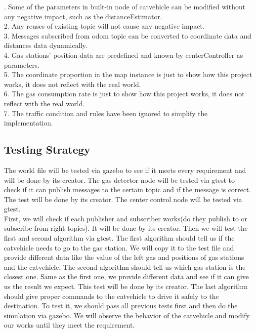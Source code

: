 \documentclass[12pt,onecolumn,titlepage]{article}
\begin{document}
. Some of the parameters in built-in node of catvehicle can be modified without any negative impact, such as the distanceEstimator.\\
2. Any reuses of existing topic will not cause any negative impact. \\
3. Messages subscribed from odom topic can be converted to coordinate data and distances data dynamically. \\
4. Gas stations' position data are predefined and known by centerController as parameters. \\
5. The coordinate proportion in the map instance is just to show how this project works, it does not reflect with the real world.\\
6. The gas consumption rate is just to show how this project works, it does not reflect with the real world.\\
7. The traffic condition and rules have been ignored to simplify the implementation.\\

\subsection{Testing Strategy}

\noindent The world file will be tested via gazebo to see if it meets every requirement and will be done by its creator. The gas detector node will be tested via gtest to check if it can publish messages to the certain topic and if the message is correct. The test will be done by its creator. The center control node will be tested via gtest.\\
 
\noindent First, we will check if each publisher and subscriber works(do they publish to or subscribe from right topics). It will be done by its creator. Then we will test the first and second algorithm via gtest. The first algorithm should tell us if the catvehicle needs to go to the gas station. We will copy it to the test file and provide different data like the value of the left gas and positions of gas stations and the catvehicle. The second algorithm should tell us which gas station is the closest one. Same as the first one, we provide different data and see if it can give us the result we expect. This test will be done by its creator.
The last algorithm should give proper commands to the catvehicle to drive it safely to the destination. To test it, we should pass all previous tests first and then do the simulation via gazebo. We will observe the behavior of the catvehicle and modify our works until they meet the requirement.
\end{document}
